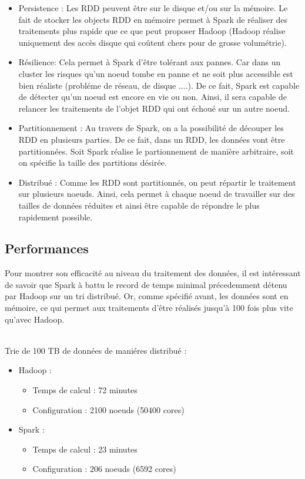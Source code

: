\begin{itemize}
	\item Persistence : Les RDD peuvent être sur le disque et/ou sur la mémoire. Le fait de stocker les objects RDD en mémoire permet à Spark de réaliser des traitements plus rapide que ce que peut proposer Hadoop (Hadoop réalise uniquement des accès disque qui coûtent chers pour de grosse volumétrie).
	\item Résilience: Cela permet à Spark d'être tolérant aux pannes. Car dans un cluster les risques qu'un noeud tombe en panne et ne soit plus accessible est bien réaliste (probléme de réseau, de disque ....). De ce fait, Spark est capable de détecter qu'un noeud est encore en vie ou non. Ainsi, il sera capable de relancer les traitements de l'objet RDD qui ont échoué sur un autre noeud.
	\item Partitionnement : Au travers de Spark, on a la possibilité de découper les RDD en plusieurs parties. De ce fait, dans un RDD, les données vont être partitionnées. Soit Spark réalise le partionnement de manière arbitraire, soit on spécifie la taille des partitions désirée.
	\item Distribué : Comme les RDD sont partitionnés, on peut répartir le traitement sur plusieurs noeuds. Ainsi, cela permet à chaque noeud de travailler sur des tailles de données réduites et ainsi être capable de répondre le plus rapidement possible.
\end{itemize}

\subsection{Performances}

Pour montrer son efficacité au niveau du traitement des données, il est intéressant de savoir que Spark à battu le record de temps minimal précedemment détenu par Hadoop sur un tri distribué. Or, comme spécifié avant, les données sont en mémoire, ce qui permet aux traitements d'être réalisés jusqu'à 100 fois plus vite qu'avec Hadoop.

\ \\
Trie de 100 TB de données de maniéres distribué :
\ \\
\begin{itemize}
	\item Hadoop :
        \begin{itemize}
            \item Temps de calcul : 72 minutes
            \item Configuration : 2100 noeuds (50400 cores)
        \end{itemize}
	\item Spark :
		\begin{itemize}
        	\item Temps de calcul : 23 minutes
        	\item Configuration : 206 noeuds (6592 cores)
        \end{itemize}
\end{itemize}

